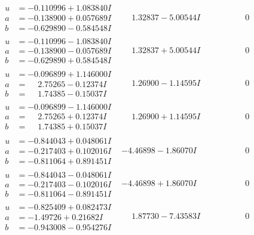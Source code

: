 \documentclass[1p]{elsarticle_modified}
\theoremstyle{definition}
\begin{document}
$$\begin{array}{c|c|c}
\begin{aligned}
u &= -0.110996 + 1.083840 I \\
a &= -0.138900 + 0.057689 I \\
b &= -0.629890 - 0.584548 I\end{aligned}
 & \phantom{-}1.32837 - 5.00544 I & \phantom{-0.000000 } 0 \\ \hline\begin{aligned}
u &= -0.110996 - 1.083840 I \\
a &= -0.138900 - 0.057689 I \\
b &= -0.629890 + 0.584548 I\end{aligned}
 & \phantom{-}1.32837 + 5.00544 I & \phantom{-0.000000 } 0 \\ \hline\begin{aligned}
u &= -0.096899 + 1.146000 I \\
a &= \phantom{-}2.75265 - 0.12374 I \\
b &= \phantom{-}1.74385 - 0.15037 I\end{aligned}
 & \phantom{-}1.26900 - 1.14595 I & \phantom{-0.000000 } 0 \\ \hline\begin{aligned}
u &= -0.096899 - 1.146000 I \\
a &= \phantom{-}2.75265 + 0.12374 I \\
b &= \phantom{-}1.74385 + 0.15037 I\end{aligned}
 & \phantom{-}1.26900 + 1.14595 I & \phantom{-0.000000 } 0 \\ \hline\begin{aligned}
u &= -0.844043 + 0.048061 I \\
a &= -0.217403 + 0.102016 I \\
b &= -0.811064 + 0.891451 I\end{aligned}
 & -4.46898 - 1.86070 I & \phantom{-0.000000 } 0 \\ \hline\begin{aligned}
u &= -0.844043 - 0.048061 I \\
a &= -0.217403 - 0.102016 I \\
b &= -0.811064 - 0.891451 I\end{aligned}
 & -4.46898 + 1.86070 I & \phantom{-0.000000 } 0 \\ \hline\begin{aligned}
u &= -0.825409 + 0.082473 I \\
a &= -1.49726 + 0.21682 I \\
b &= -0.943008 - 0.954276 I\end{aligned}
 & \phantom{-}1.87730 - 7.43583 I & \phantom{-0.000000 } 0 \\ \hline\begin{aligned}

\end{aligned}
\end{array}$$
\end{document}
